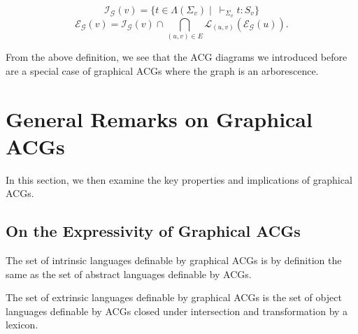 $$
\mathcal{I}_{\mathcal{G}}(v) = \{t \in \Lambda(\Sigma_v)
\mid\ \vdash_{\Sigma_v} t : S_v\}
$$
$$
\mathcal{E}_{\mathcal{G}}(v) = \mathcal{I}_{\mathcal{G}}(v) \cap
\bigcap_{(u,v) \in E} \mathcal{L}_{(u,v)}(\mathcal{E}_{\mathcal{G}}(u)).
$$

From the above definition, we see that the ACG diagrams we introduced
before are a special case of graphical ACGs where the graph is an
arborescence.

\section{General Remarks on Graphical ACGs}

In this section, we then examine the key properties and implications of
graphical ACGs.

\subsection{On the Expressivity of Graphical ACGs}

\begin{observation}
  The set of intrinsic languages definable by graphical ACGs is by
  definition the same as the set of abstract languages definable by
  ACGs.
\end{observation}

\begin{theorem}
  The set of extrinsic languages definable by graphical ACGs is the set
  of object languages definable by ACGs closed under intersection and
  transformation by a lexicon.
\end{theorem}

